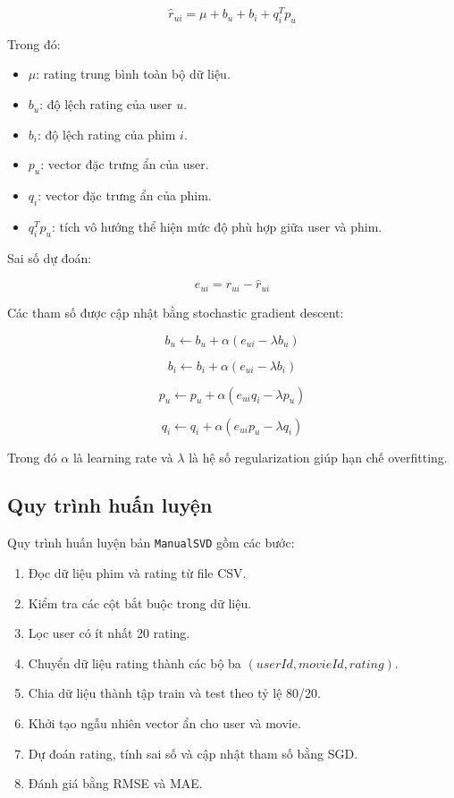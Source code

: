 \documentclass[12pt,a4paper]{article}
\begin{document}
\[
\hat{r}_{ui} = \mu + b_u + b_i + q_i^T p_u
\]

Trong đó:

\begin{itemize}
    \item \(\mu\): rating trung bình toàn bộ dữ liệu.
    \item \(b_u\): độ lệch rating của user \(u\).
    \item \(b_i\): độ lệch rating của phim \(i\).
    \item \(p_u\): vector đặc trưng ẩn của user.
    \item \(q_i\): vector đặc trưng ẩn của phim.
    \item \(q_i^T p_u\): tích vô hướng thể hiện mức độ phù hợp giữa user và phim.
\end{itemize}

Sai số dự đoán:

\[
e_{ui} = r_{ui} - \hat{r}_{ui}
\]

Các tham số được cập nhật bằng stochastic gradient descent:

\[
b_u \leftarrow b_u + \alpha(e_{ui} - \lambda b_u)
\]

\[
b_i \leftarrow b_i + \alpha(e_{ui} - \lambda b_i)
\]

\[
p_u \leftarrow p_u + \alpha(e_{ui}q_i - \lambda p_u)
\]

\[
q_i \leftarrow q_i + \alpha(e_{ui}p_u - \lambda q_i)
\]

Trong đó \(\alpha\) là learning rate và \(\lambda\) là hệ số regularization giúp hạn chế overfitting.

\subsection{Quy trình huấn luyện}

Quy trình huấn luyện bản \texttt{ManualSVD} gồm các bước:

\begin{enumerate}
    \item Đọc dữ liệu phim và rating từ file CSV.
    \item Kiểm tra các cột bắt buộc trong dữ liệu.
    \item Lọc user có ít nhất 20 rating.
    \item Chuyển dữ liệu rating thành các bộ ba \((userId, movieId, rating)\).
    \item Chia dữ liệu thành tập train và test theo tỷ lệ 80/20.
    \item Khởi tạo ngẫu nhiên vector ẩn cho user và movie.
    \item Dự đoán rating, tính sai số và cập nhật tham số bằng SGD.
    \item Đánh giá bằng RMSE và MAE.
\end{enumerate}
\end{document}
